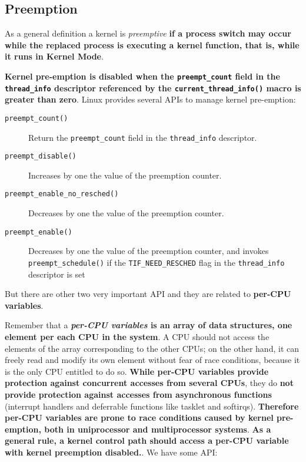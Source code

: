 \documentclass[10pt,a4paper]{article}
\begin{document}
\subsection{Preemption}

As a general definition a kernel is \textit{preemptive} \textbf{if a process switch may occur while the replaced process is executing a kernel function, that is, while it runs in Kernel Mode}. 

\textbf{Kernel pre-emption is disabled when the \texttt{preempt\_count} field in the \texttt{thread\_info} descriptor referenced by the \texttt{current\_thread\_info()} macro \textbf{is greater than zero}}. Linux provides several APIs to manage kernel pre-emption:
\begin{description}
\item[\texttt{preempt\_count()}] Return the \texttt{preempt\_count} field in the \texttt{thread\_info} descriptor.
\item[\texttt{preempt\_disable()}] Increases by one the value of the preemption counter.
\item[\texttt{preempt\_enable\_no\_resched()}] Decreases by one the value of the preemption counter.
\item[\texttt{preempt\_enable()}] Decreases by one the value of the preemption counter, and invokes \texttt{preempt\_schedule()} if the \texttt{TIF\_NEED\_RESCHED} flag in the \texttt{thread\_info} descriptor is set
\end{description}

But there are other two very important API and they are related to \textbf{per-CPU variables}. 

Remember that a \textbf{\textit{per-CPU variables} is an array of data structures, one element per each CPU in the system}. A CPU should not access the elements of the array corresponding to the other CPUs; on the other hand, it can freely read and modify its own element without fear of race conditions, because it is the only CPU entitled to do so. \textbf{While per-CPU variables provide protection against concurrent accesses from several CPUs}, they do \textbf{not provide protection against accesses from asynchronous functions} (interrupt handlers and deferrable functions like tasklet and softirqs). \textbf{Therefore per-CPU variables are prone to race conditions caused by kernel pre-emption, both in uniprocessor and multiprocessor systems}. \textbf{As a general rule, a kernel control path should access a per-CPU variable with kernel preemption disabled.}. We have some API:
\end{document}
